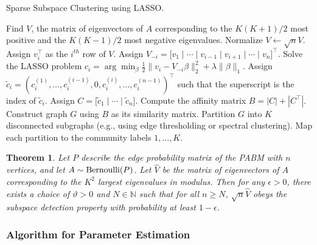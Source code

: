 \documentclass[
  12pt,
]{article}
\newtheorem{theorem}{Theorem}[section]
\theoremstyle{definition}
\theoremstyle{definition}
\theoremstyle{definition}
\theoremstyle{definition}
\theoremstyle{remark}
\begin{document}
\begin{algorithm}[t]
\label{alg:ssc}
\DontPrintSemicolon
\SetAlgoLined
\caption{Sparse Subspace Clustering using LASSO.}
Find $V$, the matrix of eigenvectors of $A$
corresponding to the $K (K + 1) / 2$ most positive
and the $K (K - 1) / 2$ most negative eigenvalues.\;
Normalize $V \leftarrow \sqrt{n} V$.\;
 {
Assign $v_i^\top$ as the $i^{th}$ row of $V$.
Assign $V_{-i} = \bigl[
v_1 \mid \cdots \mid v_{i-1} \mid v_{i+1} \mid \cdots \mid v_n \bigr]^\top$.\;
Solve the LASSO problem
$c_i = \arg\min_{\beta}
\frac{1}{2} \|v_i - V_{-i} \beta\|_2^2 + \lambda \|\beta\|_1$.\;
Assign $\tilde{c}_i = (c_i^{(1)}, \dots, c_i^{(i-1)}, 0, c_i^{(i)}, \dots, c_i^{(n-1)})^\top$ such that the superscript is the index of
$\tilde{c}_i$.\;
}
Assign
$C = \bigr[ \tilde{c}_1 \mid \cdots \mid \tilde{c}_n \bigr]$.\;
Compute the affinity matrix $B = |C| + |C^\top|$.\;
Construct graph $G$ using $B$ as its similarity matrix.\;
Partition $G$ into $K$ disconnected subgraphs (e.g., using edge
thresholding or spectral clustering).\;
Map each partition to the community labels $1, ..., K$.
\end{algorithm}

\begin{theorem}
\label{thm:ssc}
Let $P$ describe the edge probability matrix of the PABM with $n$ vertices, and let $A \sim \mathrm{Bernoulli}(P)$. 
Let $\hat{V}$ be the matrix of eigenvectors of $A$ corresponding to the $K^2$ largest eigenvalues in modulus. 
Then for any $\epsilon > 0$, there exists a choice of $\vartheta > 0$ and $N \in \mathbb{N}$ such that for all $n \geq N$, $\sqrt{n} \hat{V}$ obeys the subspace detection property with probability at least $1 - \epsilon$.  
\end{theorem}

\hypertarget{algorithm-for-parameter-estimation}{%
\subsubsection{Algorithm for Parameter Estimation}\label{algorithm-for-parameter-estimation}}
\end{document}
